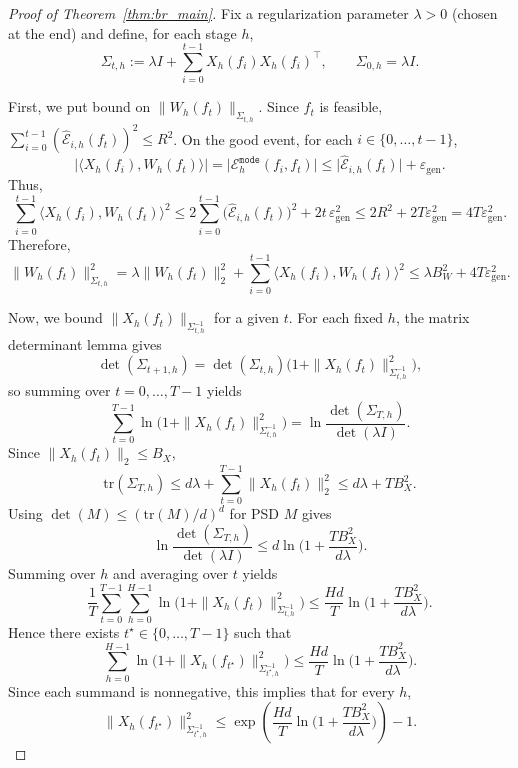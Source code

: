 \begin{proof}[Proof of Theorem~\ref{thm:br_main}]
Fix a regularization parameter $\lambda>0$ (chosen at the end) and define, for each stage $h$,
\[
\Sigma_{t,h}:=\lambda I+\sum_{i=0}^{t-1} X_h(f_i)X_h(f_i)^\top,
\qquad
\Sigma_{0,h}=\lambda I .
\]

First, we put bound on $\|W_h(f_t)\|_{\Sigma_{t,h}}$.
Since $f_t$ is feasible,
$\sum_{i=0}^{t-1}(\widehat{\mathcal{E}}_{i,h}(f_t))^2\le R^2$.
On the good event, for each $i\in\{0,\dots,t-1\}$,
\[
\big|\langle X_h(f_i),W_h(f_t)\rangle\big|
=
\big|\mathcal{E}^{\mathtt{mode}}_h(f_i,f_t)\big|
\le
\big|\widehat{\mathcal{E}}_{i,h}(f_t)\big|+\varepsilon_{\mathrm{gen}}.
\]
Thus,
\[
\sum_{i=0}^{t-1}\langle X_h(f_i),W_h(f_t)\rangle^2
\le
2\sum_{i=0}^{t-1}\big(\widehat{\mathcal{E}}_{i,h}(f_t)\big)^2 + 2t\,\varepsilon_{\mathrm{gen}}^2
\le
2R^2+2T\varepsilon_{\mathrm{gen}}^2
=
4T\varepsilon_{\mathrm{gen}}^2.
\]
Therefore,
\begin{equation}
\label{eq:br_W_norm_bound}
\|W_h(f_t)\|_{\Sigma_{t,h}}^2
=
\lambda\|W_h(f_t)\|_2^2 + \sum_{i=0}^{t-1}\langle X_h(f_i),W_h(f_t)\rangle^2
\le
\lambda B_W^2 + 4T\varepsilon_{\mathrm{gen}}^2.
\end{equation}

Now, we bound $\|X_h(f_t)\|_{\Sigma_{t,h}^{-1}}$ for a given $t$.
For each fixed $h$, the matrix determinant lemma gives
\[
\det(\Sigma_{t+1,h})=\det(\Sigma_{t,h})\Big(1+\|X_h(f_t)\|_{\Sigma_{t,h}^{-1}}^2\Big),
\]
so summing over $t=0,\dots,T-1$ yields
\[
\sum_{t=0}^{T-1}\ln\Big(1+\|X_h(f_t)\|_{\Sigma_{t,h}^{-1}}^2\Big)
=
\ln\frac{\det(\Sigma_{T,h})}{\det(\lambda I)}.
\]
Since $\|X_h(f_t)\|_2\le B_X$,
\[
\mathrm{tr}(\Sigma_{T,h})
\le d\lambda + \sum_{t=0}^{T-1}\|X_h(f_t)\|_2^2
\le d\lambda + T B_X^2.
\]
Using $\det(M)\le (\mathrm{tr}(M)/d)^d$ for PSD $M$ gives
\[
\ln\frac{\det(\Sigma_{T,h})}{\det(\lambda I)}
\le
d\ln\Big(1+\frac{T B_X^2}{d\lambda}\Big).
\]
Summing over $h$ and averaging over $t$ yields
\[
\frac{1}{T}\sum_{t=0}^{T-1}\sum_{h=0}^{H-1}\ln\Big(1+\|X_h(f_t)\|_{\Sigma_{t,h}^{-1}}^2\Big)
\le
\frac{Hd}{T}\ln\Big(1+\frac{T B_X^2}{d\lambda}\Big).
\]
Hence there exists $t^\star\in\{0,\dots,T-1\}$ such that
\[
\sum_{h=0}^{H-1}\ln\Big(1+\|X_h(f_{t^\star})\|_{\Sigma_{t^\star,h}^{-1}}^2\Big)
\le
\frac{Hd}{T}\ln\Big(1+\frac{T B_X^2}{d\lambda}\Big).
\]
Since each summand is nonnegative, this implies that for every $h$,
\begin{equation}
\label{eq:br_X_norm_bound}
\|X_h(f_{t^\star})\|_{\Sigma_{t^\star,h}^{-1}}^2
\le
\exp\!\left(\frac{Hd}{T}\ln\Big(1+\frac{T B_X^2}{d\lambda}\Big)\right)-1.
\end{equation}



\end{proof}
